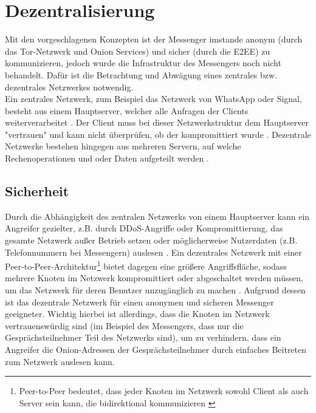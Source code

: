 \documentclass[a4paper,ngerman, headheight=28pt,12pt, footheight=27pt]{scrartcl}
\newcommand{\vcite}[1]{\cite[vgl.][]{#1}}
\begin{document}
\section{Dezentralisierung}
Mit den vorgeschlagenen Konzepten ist der Messenger imstande anonym (durch das Tor-Netzwerk und Onion Services) und sicher (durch die E2EE) zu kommunizieren, jedoch wurde die Infrastruktur des Messengers noch nicht behandelt. Dafür ist die Betrachtung und Abwägung eines zentrales bzw. dezentrales Netzwerkes notwendig. \\
Ein zentrales Netzwerk, zum Beispiel das Netzwerk von WhatsApp oder Signal, besteht aus einem Hauptserver, welcher alle Anfragen der Clients weiterverarbeitet \vcite{WhatsappCentralized,SignalCentralized, CentralizedDefinition}.
Der Client muss bei dieser Netzwerkstruktur dem Hauptserver "vertrauen" und kann nicht überprüfen, ob der kompromittiert wurde \vcite{MessagingNetwork}. Dezentrale Netzwerke bestehen hingegen aus mehreren Servern, auf welche Rechenoperationen und oder Daten aufgeteilt werden \vcite{DecentralizedDefinition}.


\subsection{Sicherheit}
Durch die Abhängigkeit des zentralen Netzwerks von einem Hauptserver kann ein Angreifer gezielter, z.B. durch DDoS-Angriffe oder Kompromittierung, das gesamte Netzwerk außer Betrieb setzen oder möglicherweise Nutzerdaten (z.B. Telefonnummern bei Messengern) auslesen \vcite{CentralizedAttacks}.
Ein dezentrales Netzwerk mit einer Peer-to-Peer-Architektur\footnote{Peer-to-Peer bedeutet, dass jeder Knoten im Netzwerk sowohl Client als auch Server sein kann, die bidirektional kommunizieren \vcite{PeerToPeerDef}} bietet dagegen eine größere Angriffsfläche, sodass mehrere Knoten im Netzwerk kompromittiert oder abgeschaltet werden müssen, um das Netzwerk für deren Benutzer unzugänglich zu machen \vcite{GeeksCentralizeDecentralized}. Aufgrund dessen ist das dezentrale Netzwerk für einen anonymen und sicheren Messenger geeigneter.
Wichtig hierbei ist allerdings, dass die Knoten im Netzwerk vertrauenswürdig sind (im Beispiel des Messengers, dass nur die Gesprächsteilnehmer Teil des Netzwerks sind), um zu verhindern, dass ein Angreifer die Onion-Adressen der Gesprächsteilnehmer durch einfaches Beitreten zum Netzwerk auslesen kann.
\end{document}
